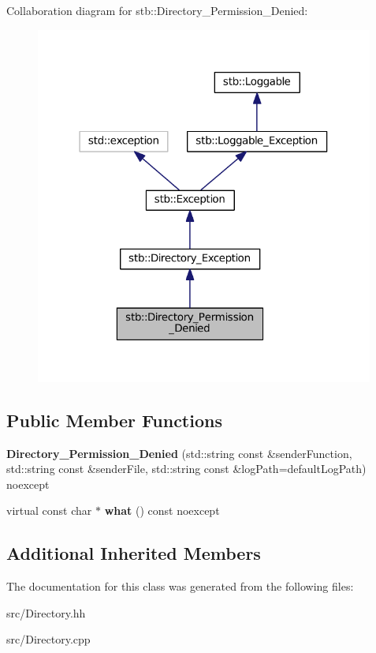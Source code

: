 Collaboration diagram for stb\+:\+:Directory\+\_\+\+Permission\+\_\+\+Denied\+:
\nopagebreak
\begin{figure}[H]
\begin{center}
\leavevmode
\includegraphics[width=316pt]{classstb_1_1Directory__Permission__Denied__coll__graph}
\end{center}
\end{figure}
\subsection*{Public Member Functions}
\begin{DoxyCompactItemize}
\item 
\hypertarget{classstb_1_1Directory__Permission__Denied_a25f4e1b4b7cacb6041b5fde953bbb2bf}{{\bfseries Directory\+\_\+\+Permission\+\_\+\+Denied} (std\+::string const \&sender\+Function, std\+::string const \&sender\+File, std\+::string const \&log\+Path=default\+Log\+Path) noexcept}\label{classstb_1_1Directory__Permission__Denied_a25f4e1b4b7cacb6041b5fde953bbb2bf}

\item 
\hypertarget{classstb_1_1Directory__Permission__Denied_ac03c8c411fff5d19ca7ea115a9f1d8a4}{virtual const char $\ast$ {\bfseries what} () const noexcept}\label{classstb_1_1Directory__Permission__Denied_ac03c8c411fff5d19ca7ea115a9f1d8a4}

\end{DoxyCompactItemize}
\subsection*{Additional Inherited Members}


The documentation for this class was generated from the following files\+:\begin{DoxyCompactItemize}
\item 
src/Directory.\+hh\item 
src/Directory.\+cpp\end{DoxyCompactItemize}
